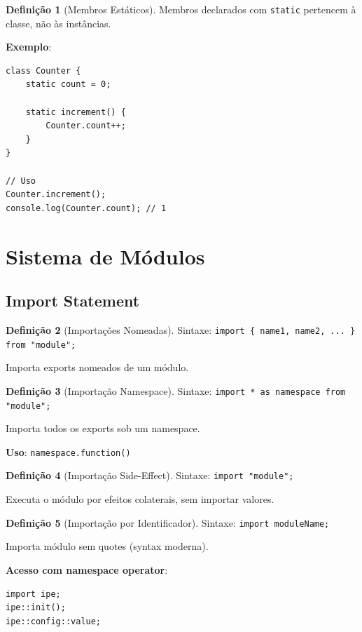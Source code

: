 \documentclass[12pt,a4paper]{article}
\theoremstyle{definition}
\newtheorem{definition}{Definição}[section]
\begin{document}
\begin{definition}[Membros Estáticos]
Membros declarados com \texttt{static} pertencem à classe, não às instâncias.

\textbf{Exemplo}:
\begin{verbatim}
class Counter {
    static count = 0;
    
    static increment() {
        Counter.count++;
    }
}

// Uso
Counter.increment();
console.log(Counter.count); // 1
\end{verbatim}
\end{definition}

\section{Sistema de Módulos}

\subsection{Import Statement}

\begin{definition}[Importações Nomeadas]
Sintaxe: \texttt{import \{ name1, name2, ... \} from "module";}

Importa exports nomeados de um módulo.
\end{definition}

\begin{definition}[Importação Namespace]
Sintaxe: \texttt{import * as namespace from "module";}

Importa todos os exports sob um namespace.

\textbf{Uso}: \texttt{namespace.function()}
\end{definition}

\begin{definition}[Importação Side-Effect]
Sintaxe: \texttt{import "module";}

Executa o módulo por efeitos colaterais, sem importar valores.
\end{definition}

\begin{definition}[Importação por Identificador]
Sintaxe: \texttt{import moduleName;}

Importa módulo sem quotes (syntax moderna).

\textbf{Acesso com namespace operator}:
\begin{verbatim}
import ipe;
ipe::init();
ipe::config::value;
\end{verbatim}
\end{definition}
\end{document}
